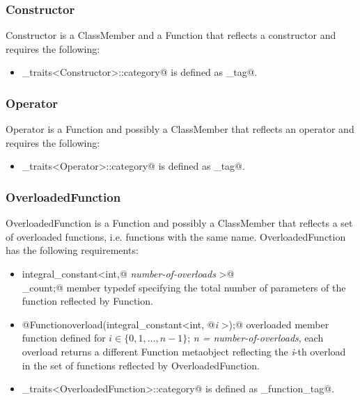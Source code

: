 \subsubsection{Constructor}

{\metaobject Constructor} is a {\metaobject ClassMember} and a {\metaobject Function} that
reflects a constructor and requires the following:

\begin{itemize}
	\item \verb@metaobject_traits<Constructor>::category@ is defined as  \verb@constructor_tag@.
\end{itemize}

\subsubsection{Operator}

{\metaobject Operator} is a {\metaobject Function} and possibly a {\metaobject ClassMember}
that reflects an operator and requires the following:

\begin{itemize}
	\item \verb@metaobject_traits<Operator>::category@ is defined as  \verb@operator_tag@.
\end{itemize}

\subsubsection{OverloadedFunction}

{\metaobject OverloadedFunction} is a {\metaobject Function} and possibly a {\metaobject ClassMember}
that reflects a set of overloaded functions, i.e. functions with the same name.
{\metaobject OverloadedFunction} has the following requirements:

\begin{itemize}

	\item{\verb@typedef integral_constant<int,@ {\em number-of-overloads}
	\verb@>@\\\verb@overload_count;@} member typedef specifying the total number
	of parameters of the function reflected by {\metaobject Function}.

	\item{\verb@static @{\metaobject Function}\verb@ overload(integral_constant<int, @{\em i}
	\verb@>);@} overloaded member function defined
	for $i \in \{0, 1, \dots, n-1\}$; {\em n = number-of-overloads},
	each overload returns a different {\metaobject Function} metaobject reflecting the {\em i}-th overload
	in the set of functions reflected by {\metaobject OverloadedFunction}.

	\item \verb@metaobject_traits<OverloadedFunction>::category@ is defined as 
	\verb@overloaded_function_tag@.
\end{itemize}

